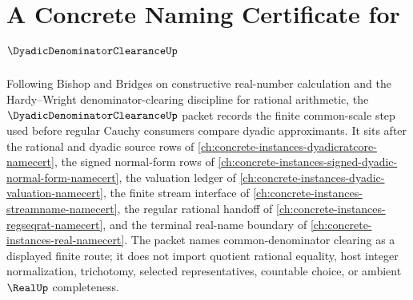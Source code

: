 \chapter{A Concrete Naming Certificate for $\DyadicDenominatorClearanceUp$}
\label{ch:concrete-instances-dyadic-denominator-clearance-namecert}

Following Bishop and Bridges on constructive real-number calculation and the Hardy--Wright denominator-clearing discipline for rational arithmetic, the $\DyadicDenominatorClearanceUp$ packet records the finite common-scale step used before regular Cauchy consumers compare dyadic approximants. It sits after the rational and dyadic source rows of \autoref{ch:concrete-instances-dyadicratcore-namecert}, the signed normal-form rows of \autoref{ch:concrete-instances-signed-dyadic-normal-form-namecert}, the valuation ledger of \autoref{ch:concrete-instances-dyadic-valuation-namecert}, the finite stream interface of \autoref{ch:concrete-instances-streamname-namecert}, the regular rational handoff of \autoref{ch:concrete-instances-regseqrat-namecert}, and the terminal real-name boundary of \autoref{ch:concrete-instances-real-namecert}. The packet names common-denominator clearing as a displayed finite route; it does not import quotient rational equality, host integer normalization, trichotomy, selected representatives, countable choice, or ambient $\RealUp$ completeness.

